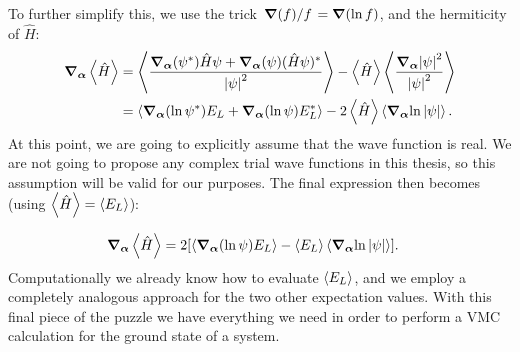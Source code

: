 \documentclass[Thesis.tex]{subfiles}
\begin{document}
To further simplify this, we use the trick $\flatfrac{\grad(f)}{f}=\grad(\ln
f)$, and the hermiticity of $\hat H$:
\begin{align}
    \grad_{\bm{\alpha}}\expval{\hat H}
    &= \expval{\frac{\grad_{\bm{\alpha}}(\psi^*)\hat H\psi + \grad_{\bm{\alpha}}(\psi)(\hat H\psi)^*}{\abs{\psi}^2}}
    - \expval{\hat H}\expval{\frac{\grad_{\bm{\alpha}}\abs{\psi}^2}{\abs{\psi}^2}}\\
    &= \expval{\grad_{\bm{\alpha}}(\ln \psi^*) E_L + \grad_{\bm{\alpha}}(\ln\psi)E_L^*}
    - 2\expval{\hat H}\expval{\grad_{\bm{\alpha}}{\ln\abs{\psi}}}.
\end{align}
At this point, we are going to explicitly assume that the wave function is
real. We are not going to propose any complex trial wave functions in this
thesis, so this assumption will be valid for our purposes. The final expression then becomes (using $\expval{\hat H}=\expval{E_L}$):

\begin{align}
    \grad_{\bm{\alpha}}\expval{\hat H}
    &= 2\qty[\expval{\grad_{\bm{\alpha}}(\ln \psi) E_L}
    - \expval{E_L}\expval{\grad_{\bm{\alpha}}{\ln\abs{\psi}}}].
    \label{eq:local-energy-gradient-alpha}
\end{align}
Computationally we already know how to evaluate $\expval{E_L}$, and we employ a completely analogous approach for the two other expectation values.
With this final piece of the puzzle we have everything we need in order to perform a VMC calculation for the ground state of a system.
\end{document}
